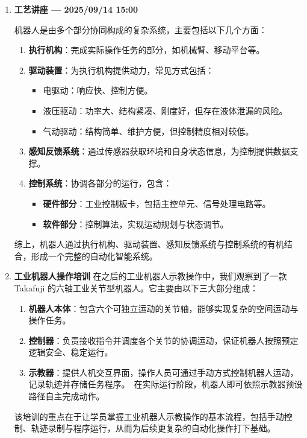 \begin{enumerate}[label=\arabic*., labelindent=0pt, itemindent=2em, listparindent=0pt, left=1.5em]
\item \textbf{工艺讲座 — 2025/09/14 15:00}

机器人是由多个部分协同构成的复杂系统，主要包括以下几个方面：
\begin{enumerate}
  \item \textbf{执行机构}：完成实际操作任务的部分，如机械臂、移动平台等。
  \item \textbf{驱动装置}：为执行机构提供动力，常见方式包括：
    \begin{itemize}
      \item 电驱动：响应快、控制方便。
      \item 液压驱动：功率大、结构紧凑、刚度好，但存在液体泄漏的风险。
      \item 气动驱动：结构简单、维护方便，但控制精度相对较低。
    \end{itemize}
  \item \textbf{感知反馈系统}：通过传感器获取环境和自身状态信息，为控制提供数据支撑。
  \item \textbf{控制系统}：协调各部分的运行，包含：
    \begin{itemize}
      \item \textbf{硬件部分}：工业控制板卡，包括主控单元、信号处理电路等。
      \item \textbf{软件部分}：控制算法，实现运动规划与状态调节。
    \end{itemize}
\end{enumerate}
综上，机器人通过执行机构、驱动装置、感知反馈系统与控制系统的有机结合，形成一个完整的自动化智能系统。

\item \textbf{工业机器人操作培训}
在之后的工业机器人示教操作中，我们观察到了一款 Takafuji 的六轴工业关节型机器人。它主要由以下三大部分组成：
\begin{enumerate}
  \item \textbf{机器人本体}：包含六个可独立运动的关节轴，能够实现复杂的空间运动与操作任务。
  \item \textbf{控制器}：负责接收指令并调度各个关节的协调运动，保证机器人按照预定逻辑安全、稳定运行。
  \item \textbf{示教器}：提供人机交互界面，操作人员可通过手动方式控制机器人运动，记录轨迹并存储任务程序。\
  在实际运行阶段，机器人即可依照示教器预设路径自主完成动作。
\end{enumerate}
该培训的重点在于让学员掌握工业机器人示教操作的基本流程，包括手动控制、轨迹录制与程序运行，从而为后续更复杂的自动化操作打下基础。


\end{enumerate}
